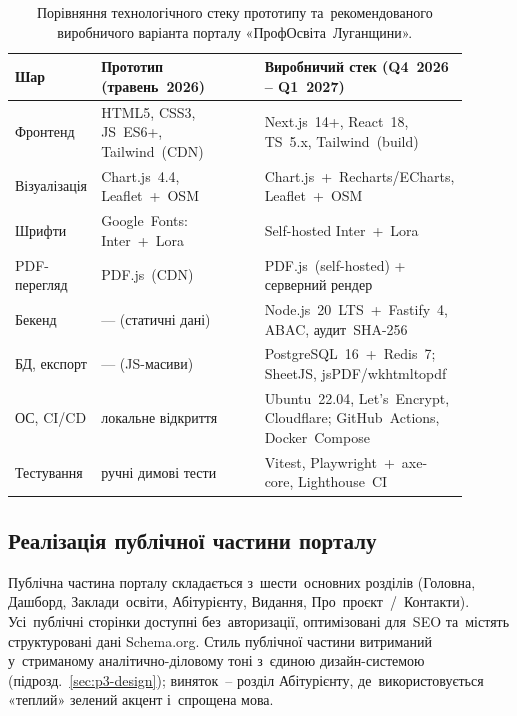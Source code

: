 \begin{table}[htbp]
\centering
\caption{Порівняння технологічного стеку прототипу та~рекомендованого виробничого варіанта порталу «ПрофОсвіта~Луганщини».}
\label{tab:p3-stack}
\small
\setlength\tabcolsep{4pt}
\renewcommand{\arraystretch}{1.05}
\begin{tabular}{|p{0.18\linewidth}|p{0.36\linewidth}|p{0.36\linewidth}|}
\hline
\textbf{Шар} & \textbf{Прототип (травень~2026)} & \textbf{Виробничий стек (Q4~2026 -- Q1~2027)} \\
\hline
Фронтенд & HTML5, CSS3, JS~ES6+, Tailwind~(CDN) & Next.js~14+, React~18, TS~5.x, Tailwind~(build) \\
\hline
Візуалізація & Chart.js~4.4, Leaflet~+~OSM & Chart.js~+~Recharts/ECharts, Leaflet~+~OSM \\
\hline
Шрифти & Google~Fonts: Inter~+~Lora & Self-hosted Inter~+~Lora \\
\hline
PDF-перегляд & PDF.js~(CDN) & PDF.js~(self-hosted) + серверний рендер \\
\hline
Бекенд & ---  (статичні дані) & Node.js~20~LTS~+~Fastify~4, ABAC, аудит~SHA-256 \\
\hline
БД, експорт & ---  (JS-масиви) & PostgreSQL~16~+~Redis~7; SheetJS, jsPDF/wkhtmltopdf \\
\hline
ОС, CI/CD & локальне відкриття & Ubuntu~22.04, Let's~Encrypt, Cloudflare; GitHub~Actions, Docker~Compose \\
\hline
Тестування & ручні димові тести & Vitest, Playwright~+~axe-core, Lighthouse~CI \\
\hline
\end{tabular}
\end{table}

\subsection{Реалізація публічної частини порталу}
\label{sec:p3-public}

Публічна частина порталу складається з~шести~основних розділів (Головна, Дашборд, Заклади~освіти, Абітурієнту, Видання, Про~проєкт~/~Контакти). Усі~публічні сторінки доступні без~авторизації, оптимізовані для~SEO та~містять структуровані дані Schema.org. Стиль публічної частини витриманий у~стриманому аналітично-діловому тоні з~єдиною дизайн-системою (підрозд.~\ref{sec:p3-design}); виняток~-- розділ Абітурієнту, де~використовується «теплий» зелений акцент і~спрощена мова.

